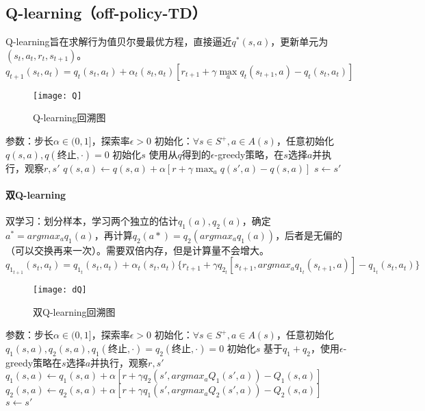 \documentclass[
12pt, %
a4paper, 
oneside, %
headinclude,footinclude, %
]{scrartcl}
\begin{document}
\subsection[Q-learning]{Q-learning（off-policy-TD）}
Q-learning旨在求解行为值贝尔曼最优方程，直接逼近$ q^*(s, a) $，更新单元为$ (s_t, a_t, r_t, s_{t + 1}) $。
$$ q_{t + 1}(s_t, a_t) = q_t(s_t, a_t) + \alpha_t(s_t, a_t)[r_{t + 1} + \gamma \max_a q_t(s_{t + 1}, a) - q_t(s_t, a_t)] $$

\begin{figure}[H]
\centering
\texttt{[image: Q]}
\caption{Q-learning回溯图}
\end{figure}
\begin{myalgorithm}
\State 参数：步长$ \alpha \in (0,1] $，探索率$ \epsilon > 0 $
\State 初始化：$ \forall s \in S^+, a \in A(s) $，任意初始化$ q(s,a), q(\text{终止}, \cdot) = 0 $
\State 初始化$ s $
\State 使用从$ q $得到的$ \epsilon $-greedy策略，在$ s $选择$ a $并执行，观察$ r, s' $
\State $ q(s, a) \gets q(s, a) + \alpha [r + \gamma \max_a q(s', a) - q(s, a)] $
\State $ s \gets s' $
\EndWhile
\EndFor
\end{myalgorithm}
\paragraph{双Q-learning}
双学习：划分样本，学习两个独立的估计$ q_1(a), q_2(a) $，确定$ a^* = argmax_a q_1(a) $，再计算$ q_2(a*) = q_2(argmax_a q_1(a)) $，后者是无偏的（可以交换再来一次）。需要双倍内存，但是计算量不会增大。
$$ q_{1_{t + 1}}(s_t, a_t) = q_{1_t}(s_t, a_t) + \alpha_t(s_t, a_t)\{r_{t + 1} + \gamma q_{2_t}[s_{t + 1}, argmax_a q_{1_t}(s_{t + 1}, a)] - q_{1_t}(s_t, a_t)\} $$

\begin{figure}[H]
\centering
\texttt{[image: dQ]}
\caption{双Q-learning回溯图}
\end{figure}
\begin{myalgorithm}[双Q-learning]
\State 参数：步长$ \alpha \in (0,1] $，探索率$ \epsilon > 0 $
\State 初始化：$ \forall s \in S^+, a \in A(s) $，任意初始化$ q_1(s,a), q_2(s,a), q_1(\text{终止}, \cdot) = q_2(\text{终止}, \cdot) = 0 $
\State 初始化$ s $
\State 基于$ q_1 + q_2 $，使用$ \epsilon $-greedy策略在$ s $选择$ a $并执行，观察$ r, s' $
\State $ q_1(s, a) \gets q_1(s, a) + \alpha [r + \gamma q_2(s', argmax_a Q_1(s',a)) - Q_1(s, a)] $
\Else
\State $ q_2(s, a) \gets q_2(s, a) + \alpha [r + \gamma q_1(s', argmax_a Q_2(s',a)) - Q_2(s, a)] $
\EndIf
\State $ s \gets s' $
\EndWhile
\EndFor
\end{myalgorithm}
\end{document}
